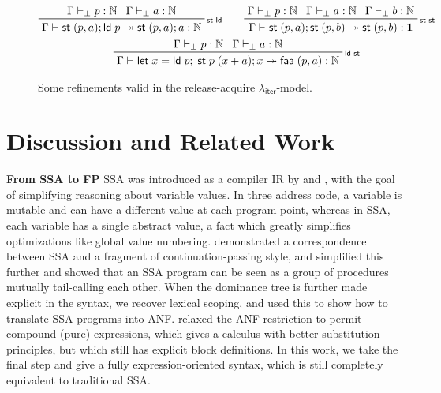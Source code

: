 \documentclass[acmsmall,screen,review]{acmart}
\newcommand{\mb}[1]{\ensuremath{\mathbf{#1}}}
\newcommand{\ms}[1]{\ensuremath{\mathsf{#1}}}
\newcommand{\nats}{\mathbb{N}}
\newcommand{\letexpr}[3]{\ensuremath{\ms{let}\;#1 = #2;\;#3}}
\newcommand{\rle}[1]{{\scriptsize\textsf{#1}}}
\newcommand{\hasty}[4]{#1 \vdash_{#2} #3: {#4}}
\newcommand{\tref}{\twoheadrightarrow}
\newcommand{\tmle}[5]{#1 \vdash_{#2} #3 \tref #4 : {#5}}
\newcommand{\subiterexp}{\texorpdfstring{\(\lambda_{\ms{iter}}\)}{lambda-iter}}
\begin{document}
\begin{figure}
  \begin{adjustbox}{minipage=1.1\textwidth,scale=0.9}
  \begin{gather*}
    \prftree[r]{\rle{st-ld}}
      {\hasty{\Gamma}{\bot}{p}{\nats}}
      {\hasty{\Gamma}{\bot}{a}{\nats}}
      {\tmle{\Gamma}{}{\ms{st}\;(p, a) ; \ms{ld}\;p}{\ms{st}\;(p, a) ; a}{\nats}}
      \qquad
    \prftree[r]{\rle{st-st}}
      {\hasty{\Gamma}{\bot}{p}{\nats}}
      {\hasty{\Gamma}{\bot}{a}{\nats}}
      {\hasty{\Gamma}{\bot}{b}{\nats}}
      {\tmle{\Gamma}{}{\ms{st}\;(p, a) ; \ms{st}\;(p, b)}{\ms{st}\;(p, b)}{\mb{1}}}
    \\
    \prftree[r]{\rle{ld-st}}
      {\hasty{\Gamma}{\bot}{p}{\nats}}
      {\hasty{\Gamma}{\bot}{a}{\nats}}
      {\tmle{\Gamma}{}{\letexpr{x}{\ms{ld}\;p}{\ms{st}\;p\;(x + a) ; x}}{\ms{faa}\;(p, a)}{\nats}}
  \end{gather*}
  \end{adjustbox}
  \caption{Some refinements valid in the release-acquire \subiterexp{}-model.}
  \label{fig:weak-refinements}
  \Description{}
\end{figure}

\section{Discussion and Related Work}

\textbf{From SSA to FP} SSA was introduced as a compiler IR by
\citet{alpern-ssa-original-88} and \citet{rosen-gvn-1988}, with the
goal of simplifying reasoning about variable values. In three address
code, a variable is mutable and can have a different value at each
program point, whereas in SSA, each variable has a single abstract
value, a fact which greatly simplifies optimizations like global value
numbering. \citet{kelsey-95-cps} demonstrated a correspondence between
SSA and a fragment of continuation-passing style, and
\citet{appel-ssa} simplified this further and showed that an SSA
program can be seen as a group of procedures mutually tail-calling
each other. When the dominance tree is further made explicit in the
syntax, we recover lexical scoping, and
\citet{chakravarty-functional-ssa-2003} used this to show how to
translate SSA programs into ANF. \citet{ghalayini-24-ssa-densem-arxiv}
relaxed the ANF restriction to permit compound (pure)
expressions, which gives a calculus with better substitution
principles, but which still has explicit block definitions. In this
work, we take the final step and give a fully expression-oriented
syntax, which is still completely equivalent to traditional SSA.
\end{document}
